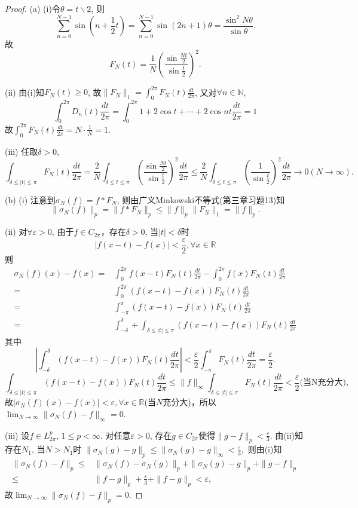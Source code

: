 \documentclass[a4paper,8pt]{ctexart}\textwidth 140mm \textheight 216mm
\newcommand{\e}{\varepsilon}
\newcommand{\8}{\infty}
\begin{document}
\begin{proof}
	(a) (i)令$\theta=t\backslash 2$, 则
	\[
	\sum_{n=0}^{N-1}\sin(n+\frac{1}{2}t)=\sum_{n=0}^{N-1}\sin(2n+1)\theta
	=\frac{\sin^2 N\theta}{\sin \theta}.
	\]	
	故
	\[F_N(t)=\frac{1}{N}\left(\frac{\sin \frac{Nt}{2}}{\sin \frac{t}{2}}\right)^2.\]
	
	(ii) 由(i)知$F_N(t)\geq 0$, 故$\|F_N\|_1=\int_0^{2\pi} F_N(t)\frac{dt}{2\pi}$, 又对$\forall n\in\mathbb{N}$,
	\[\int_0^{2\pi}D_n(t)\frac{dt}{2\pi}=\int_0^{2\pi}1+2\cos t+\cdots+2\cos nt\frac{dt}{2\pi}=1\]
	故$\int_0^{2\pi} F_N(t)\frac{dt}{2\pi}=N\cdot \frac{1}{N}=1$.
	
	(iii) 任取$\delta>0$, 
	\[\int_{\delta\leq |t|\leq \pi}F_N(t)\frac{dt}{2\pi}=\frac{2}{N}\int_{\delta\leq t\leq \pi}\left(\frac{\sin \frac{Nt}{2}}{\sin \frac{t}{2}}\right)^2\frac{dt}{2\pi}\leq \frac{2}{N}\int_{\delta\leq t\leq \pi}\left(\frac{1}{\sin \frac{t}{2}}\right)^2\frac{dt}{2\pi}\to 0(N\to\infty).\]
	
	(b) (i) 注意到$\sigma_N(f)=f*F_N$, 则由广义Minkowski不等式(第三章习题13)知
	\[\|\sigma_N(f)\|_p=\|f*F_N\|_p\leq \|f\|_p\|F_N\|_1=\|f\|_p.\]
	
	(ii) 对$\forall \e>0$, 由于$f\in C_{2\pi}$，存在$\delta>0$, 当$|t|<\delta$时
	\[|f(x-t)-f(x)|<\frac{\e}{2},\forall x\in \mathbb{R}\]
	则
	\[\begin{split}
	\sigma_N(f)(x)-f(x)=&\int_0^{2\pi} f(x-t)F_N(t)\frac{dt}{2\pi}-\int_0^{2\pi} f(x)F_N(t)\frac{dt}{2\pi}\\
	=&\int_0^{2\pi} (f(x-t)-f(x))F_N(t)\frac{dt}{2\pi}\\
	=&\int_{-\pi}^{\pi} (f(x-t)-f(x))F_N(t)\frac{dt}{2\pi}\\
	=&\int_{-\delta}^\delta+\int_{\delta \leq |t| \leq \pi}(f(x-t)-f(x))F_N(t)\frac{dt}{2\pi}
	\end{split}\]
	其中
	\[|\int_{-\delta}^\delta(f(x-t)-f(x))F_N(t)\frac{dt}{2\pi}|<\frac{\e}{2}\int_{-\pi}^\pi F_N(t)\frac{dt}{2\pi}=\frac{\e}{2}.\]
	\[\int_{\delta \leq |t| \leq \pi}(f(x-t)-f(x))F_N(t)\frac{dt}{2\pi}\leq \|f\|_{\infty}\int_{\delta\leq|t|\leq \pi}F_N(t)\frac{dt}{2\pi}<\frac{\e}{2}\text{(当N充分大)},\]
	故$|\sigma_N(f)(x)-f(x)|<\e,\forall x\in\mathbb{R}$(当$N$充分大)，所以$\lim_{N\to\infty}\|\sigma_N(f)-f\|_\infty=0$.
	
	(iii) 设$f\in L_{2\pi}^p$, $1\leq p<\infty$. 对任意$\e>0$, 存在$g\in C_{2\pi}$使得$\|g-f\|_p<\frac{\e}{3}$. 由(ii)知存在$N_1$, 当$N>N_1$时
	$\|\sigma_N(g)-g\|_p\leq \|\sigma_N(g)-g\|_\infty<\frac{\e}{3},$
	则由(i)知
	\[\begin{split}
	\|\sigma_N(f)-f\|_p\leq &\|\sigma_N(f)-\sigma_N(g)\|_p+\|\sigma_N(g)-g\|_p+\|g-f\|_p\\
	\leq& \|f-g\|_p+\frac{\e}{3}+\|f-g\|_p<\e, 
	\end{split}\]
	故$\lim_{N\to\infty}\|\sigma_{N}(f)-f\|_p=0$.
\end{proof}

\end{document}
